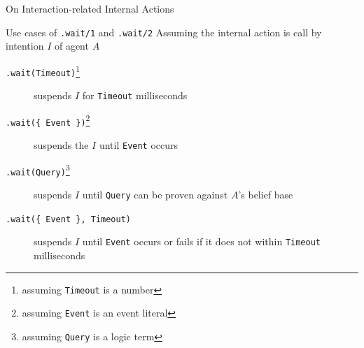 \documentclass[presentation]{beamer}\mode<presentation>{\usetheme{AMSBolognaFC}}
\begin{document}
\begin{frame}[c,allowframebreaks]{On Interaction-related Internal Actions}
\begin{block}{Use cases of \texttt{.wait/1} and \texttt{.wait/2}}
    Assuming the internal action is call by intention $I$ of agent $A$
    \begin{description}
        \item[\texttt{.wait(Timeout)}\footnote{assuming \texttt{Timeout} is a number}] suspends $I$ for \texttt{Timeout} milliseconds
        \item[\texttt{.wait(\{ Event \})}\footnote{assuming \texttt{Event} is an event literal}] suspends the $I$ until \texttt{Event} occurs
        \item[\texttt{.wait(Query)}\footnote{assuming \texttt{Query} is a logic term}] suspends $I$ until \texttt{Query} can be proven against $A$'s belief base
        \item[\texttt{.wait(\{ Event \}, Timeout)}] suspends $I$ until \texttt{Event} occurs or fails if it does not within \texttt{Timeout} milliseconds
    \end{description}
\end{block}

\end{frame} 
\end{document}
